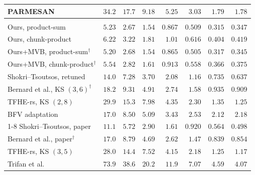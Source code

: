 \begin{table}[p]
\begin{tabular}{@{}lrrrrrrr@{}}
PARMESAN & $34.2$ & $17.7$ & $9.18$ & $5.25$ & $3.03$ & $1.79$ & $1.78$ \\
\midrule[0.8pt]
\rowcolor{black!8}\multicolumn{8}{@{}l}{\textbf{$W=64$}} \\
\midrule
Ours, product-sum & $5.23$ & $\mathbf{2.67}$ & $\mathbf{1.54}$ & $0.867$ & $0.509$ & $\mathbf{0.315}$ & $0.347$ \\
Ours, chunk-product & $6.22$ & $3.22$ & $1.81$ & $1.01$ & $0.616$ & $0.404$ & $0.419$ \\
Ours+MVB, product-sum$^\dagger$ & $\mathbf{5.20}$ & $2.68$ & $1.54$ & $\mathbf{0.865}$ & $\mathbf{0.505}$ & $0.317$ & $\mathbf{0.345}$ \\
Ours+MVB, chunk-product$^\dagger$ & $5.54$ & $2.82$ & $1.61$ & $0.913$ & $0.558$ & $0.366$ & $0.375$ \\
Shokri--Tsoutsos, retuned & $14.0$ & $7.28$ & $3.70$ & $2.08$ & $1.16$ & $0.735$ & $0.637$ \\
Bernard et al., KS $(3,6)^\dagger$ & $18.2$ & $9.31$ & $4.91$ & $2.74$ & $1.58$ & $0.935$ & $0.909$ \\
TFHE-rs, KS $(2,8)$ & $29.9$ & $15.3$ & $7.98$ & $4.35$ & $2.30$ & $1.35$ & $1.25$ \\
BFV adaptation & $17.0$ & $8.50$ & $5.09$ & $3.43$ & $2.53$ & $2.12$ & $2.18$ \\
\cmidrule(l){1-8}
Shokri--Tsoutsos, paper & $11.1$ & $5.72$ & $2.90$ & $1.61$ & $0.920$ & $0.564$ & $0.498$ \\
Bernard et al., paper$^\dagger$ & $17.0$ & $8.79$ & $4.69$ & $2.62$ & $1.47$ & $0.839$ & $0.854$ \\
TFHE-rs, KS $(3,5)$ & $28.0$ & $14.4$ & $7.52$ & $4.15$ & $2.18$ & $1.25$ & $1.17$ \\
Trifan et al. & $73.9$ & $38.6$ & $20.2$ & $11.9$ & $7.07$ & $4.59$ & $4.07$ \\
\bottomrule
\end{tabular}
\end{table}
